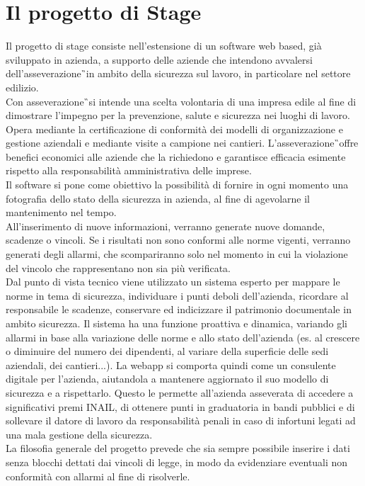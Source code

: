 \section{Il progetto di Stage}
Il progetto di stage consiste nell'estensione di un software web based, già sviluppato in azienda, a supporto delle aziende che intendono avvalersi dell’\gls{asseverazione}\G\ in ambito della sicurezza sul lavoro, in particolare nel settore edilizio. \\
Con \gls{asseverazione}\G\ si intende una scelta volontaria di una impresa edile al fine di dimostrare l'impegno per la prevenzione, salute e sicurezza nei luoghi di lavoro. Opera mediante la certificazione di conformità dei modelli di organizzazione e gestione aziendali e mediante visite a campione nei cantieri. L'\gls{asseverazione}\G\ offre benefici economici alle aziende che la richiedono e garantisce efficacia esimente rispetto alla responsabilità amministrativa delle imprese.\\
Il software si pone come obiettivo la possibilità di fornire in ogni momento una fotografia dello stato della sicurezza in azienda, al fine di agevolarne il mantenimento nel tempo.\\
All'inserimento di nuove informazioni, verranno generate nuove domande, scadenze o vincoli. Se i risultati non sono conformi alle norme vigenti, verranno generati degli allarmi, che scompariranno solo nel momento in cui la violazione del vincolo che rappresentano non sia più verificata. \\
Dal punto di vista tecnico viene utilizzato un sistema esperto per mappare le norme in tema di sicurezza, individuare i punti deboli dell’azienda, ricordare al responsabile le scadenze, conservare ed indicizzare il patrimonio documentale in ambito sicurezza.
Il sistema ha una funzione proattiva e dinamica, variando gli allarmi in base alla variazione delle norme e allo stato dell’azienda (es. al crescere o diminuire del numero dei dipendenti, al variare della superficie delle sedi aziendali, dei cantieri...). La webapp si comporta quindi come un consulente digitale per l’azienda, aiutandola a mantenere aggiornato il suo modello di sicurezza e a rispettarlo.
Questo le permette all’azienda asseverata di accedere a significativi premi INAIL, di ottenere punti in graduatoria in bandi pubblici e di sollevare il datore di lavoro da responsabilità penali in caso di infortuni legati ad una mala gestione della sicurezza.\\
La filosofia generale del progetto prevede che sia  sempre possibile inserire i dati senza blocchi dettati dai vincoli di legge, in modo da evidenziare eventuali non conformità con allarmi al fine di risolverle.

